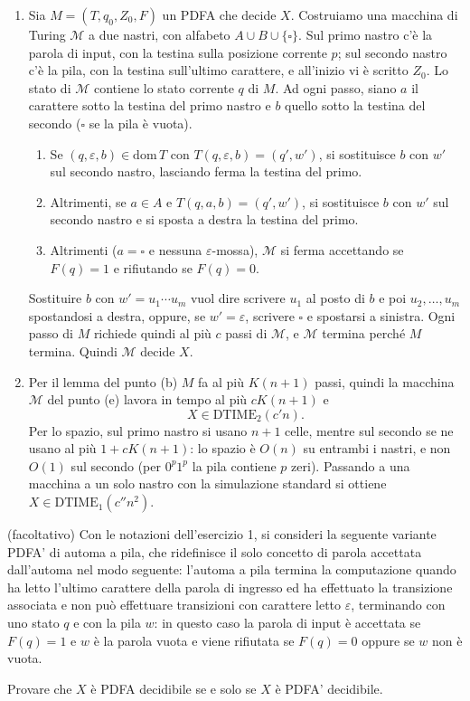 \begin{sol}
\begin{enumerate}
\item Sia $M=(T,q_0,Z_0,F)$ un PDFA che decide $X$. Costruiamo una macchina di Turing $\mathcal M$ a due nastri, con alfabeto $A\cup B\cup\{\square\}$. Sul primo nastro c'è la parola di input, con la testina sulla posizione corrente $p$; sul secondo nastro c'è la pila, con la testina sull'ultimo carattere, e all'inizio vi è scritto $Z_0$. Lo stato di $\mathcal M$ contiene lo stato corrente $q$ di $M$. Ad ogni passo, siano $a$ il carattere sotto la testina del primo nastro e $b$ quello sotto la testina del secondo ($\square$ se la pila è vuota).
\ 
\begin{enumerate}
\item Se $(q,\varepsilon,b)\in\mathrm{dom}\,T$ con $T(q,\varepsilon,b)=(q',w')$, si sostituisce $b$ con $w'$ sul secondo nastro, lasciando ferma la testina del primo.
\item Altrimenti, se $a\in A$ e $T(q,a,b)=(q',w')$, si sostituisce $b$ con $w'$ sul secondo nastro e si sposta a destra la testina del primo.
\item Altrimenti ($a=\square$ e nessuna $\varepsilon$-mossa), $\mathcal M$ si ferma accettando se $F(q)=1$ e rifiutando se $F(q)=0$.
\end{enumerate}
Sostituire $b$ con $w'=u_1\cdots u_m$ vuol dire scrivere $u_1$ al posto di $b$ e poi $u_2,\dots,u_m$ spostandosi a destra, oppure, se $w'=\varepsilon$, scrivere $\square$ e spostarsi a sinistra. Ogni passo di $M$ richiede quindi al più $c$ passi di $\mathcal M$, e $\mathcal M$ termina perché $M$ termina. Quindi $\mathcal M$ decide $X$.

\item Per il lemma del punto (b) $M$ fa al più $K(n+1)$ passi, quindi la macchina $\mathcal M$ del punto (e) lavora in tempo al più $cK(n+1)$ e
\[
X\in\mathrm{DTIME}_2(c'n).
\]
Per lo spazio, sul primo nastro si usano $n+1$ celle, mentre sul secondo se ne usano al più $1+cK(n+1)$: lo spazio è $O(n)$ su entrambi i nastri, e non $O(1)$ sul secondo (per $0^p1^p$ la pila contiene $p$ zeri). Passando a una macchina a un solo nastro con la simulazione standard si ottiene $X\in\mathrm{DTIME}_1(c''n^2)$.
\end{enumerate}
\end{sol}
\newpage

\begin{ex}
(facoltativo) Con le notazioni dell'esercizio 1, si consideri la seguente variante PDFA' di automa a pila, che ridefinisce il solo concetto di parola accettata dall'automa nel modo seguente: l'automa a pila termina la computazione quando ha letto l'ultimo carattere della parola di ingresso ed ha effettuato la transizione associata e non può effettuare transizioni con carattere letto $\varepsilon$, terminando con uno stato $q$ e con la pila $w$: in questo caso la parola di input è accettata se $F(q)=1$ e $w$ è la parola vuota e viene rifiutata se $F(q)=0$ oppure se $w$ non è vuota.

Provare che $X$ è PDFA decidibile se e solo se $X$ è PDFA' decidibile.
\end{ex}

